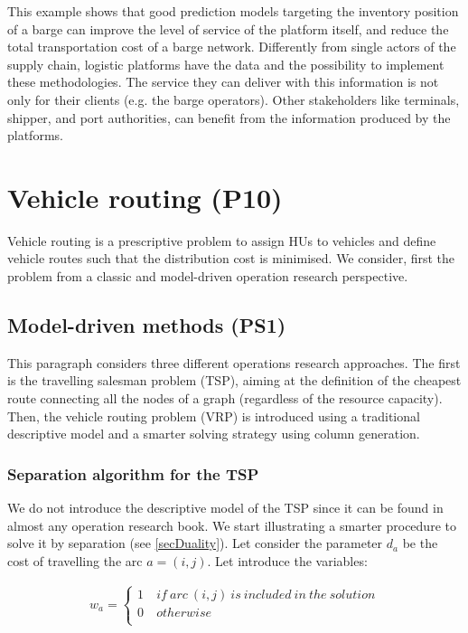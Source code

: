 This example shows that good prediction models targeting the inventory position of a barge can improve the level of service of the platform itself, and reduce the total transportation cost of a barge network. Differently from single actors of the supply chain, logistic platforms have the data and the possibility to implement these methodologies. The service they can deliver with this information is not only for their clients (e.g. the barge operators). Other stakeholders like terminals, shipper, and port authorities, can benefit from the information produced by the platforms. \par

\section{Vehicle routing (P10)}

Vehicle routing is a prescriptive problem to assign HUs to vehicles and define vehicle routes such that the distribution cost is minimised. We consider, first the problem from a classic and model-driven operation research perspective.

\subsection{Model-driven methods (PS1)} \label{secVRPmodelDriven}

This paragraph considers three different operations research approaches. The first is the travelling salesman problem (TSP), aiming at the definition of the cheapest route connecting all the nodes of a graph (regardless of the resource capacity). Then, the vehicle routing problem (VRP) is introduced using a traditional descriptive model and a smarter solving strategy using column generation.

\subsubsection{Separation algorithm for the TSP}

We do not introduce the descriptive model of the TSP since it can be found in almost any operation research book. We start illustrating a smarter procedure to solve it by separation (see \ref{secDuality}). Let consider the parameter $d_a$ be the cost of travelling the arc $a=(i,j)$. Let introduce the variables:

\begin{equation}
   \begin{split}
   w_a=\left\{
                \begin{array}{ll}
                  1\ & if\ arc\ \left(i,j\right)\ is\ included\ in\ the\ solution \\
                  0 & otherwise\\
                \end{array}
              \right.
   \end{split}
\end{equation}

